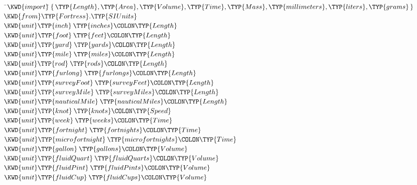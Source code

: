 \begin{Fortress}
{\tt~}\pushtabs\=\+\( \KWD{import} \null\)\pushtabs\=\+\(\{\,\TYP{Length}, \TYP{Area}, \TYP{Volume}, \TYP{Time}, \TYP{Mass}, \TYP{millimeters}, \TYP{liters}, \TYP{grams}\,\} \)\\
\(        \KWD{from} \TYP{Fortress}.\TYP{SIUnits}\)\-\\[4pt]\poptabs
\( \KWD{unit} \TYP{inch}\mskip 4mu plus 4mu\TYP{inches}\COLON \TYP{Length} \)\\
\( \KWD{unit} \TYP{foot}\mskip 4mu plus 4mu\TYP{feet}\COLON \TYP{Length} \)\\
\( \KWD{unit} \TYP{yard}\mskip 4mu plus 4mu\TYP{yards}\COLON \TYP{Length} \)\\
\( \KWD{unit} \TYP{mile}\mskip 4mu plus 4mu\TYP{miles}\COLON \TYP{Length} \)\\
\( \KWD{unit} \TYP{rod}\mskip 4mu plus 4mu\TYP{rods}\COLON \TYP{Length} \)\\
\( \KWD{unit} \TYP{furlong}\mskip 4mu plus 4mu\TYP{furlongs}\COLON \TYP{Length} \)\\[4pt]
\( \KWD{unit} \TYP{surveyFoot}\mskip 4mu plus 4mu\TYP{surveyFeet}\COLON \TYP{Length} \)\\
\( \KWD{unit} \TYP{surveyMile}\mskip 4mu plus 4mu\TYP{surveyMiles}\COLON \TYP{Length} \)\\[4pt]
\( \KWD{unit} \TYP{nauticalMile}\mskip 4mu plus 4mu\TYP{nauticalMiles}\COLON \TYP{Length} \)\\
\( \KWD{unit} \TYP{knot}\mskip 4mu plus 4mu\TYP{knots}\COLON \TYP{Speed} \)\\[4pt]
\( \KWD{unit} \TYP{week}\mskip 4mu plus 4mu\TYP{weeks}\COLON \TYP{Time} \)\\
\( \KWD{unit} \TYP{fortnight}\mskip 4mu plus 4mu\TYP{fortnights}\COLON \TYP{Time} \)\\
\( \KWD{unit} \TYP{microfortnight}\mskip 4mu plus 4mu\TYP{microfortnights}\COLON \TYP{Time} \)\\[4pt]
\( \KWD{unit} \TYP{gallon}\mskip 4mu plus 4mu\TYP{gallons}\COLON \TYP{Volume} \)\\
\( \KWD{unit} \TYP{fluidQuart}\mskip 4mu plus 4mu\TYP{fluidQuarts}\COLON \TYP{Volume} \)\\
\( \KWD{unit} \TYP{fluidPint}\mskip 4mu plus 4mu\TYP{fluidPints}\COLON \TYP{Volume}\)\\
\( \KWD{unit} \TYP{fluidCup}\mskip 4mu plus 4mu\TYP{fluidCups}\COLON \TYP{Volume} \)\\

\end{Fortress}
